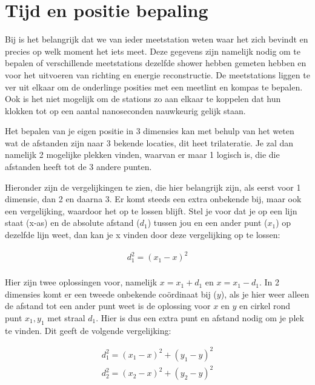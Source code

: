 \section{Tijd en positie bepaling}

Bij \hisparc is het belangrijk dat we van ieder meetstation weten waar
het zich bevindt en precies op welk moment het iets meet. Deze gegevens
zijn namelijk nodig om te bepalen of verschillende meetstations dezelfde
shower hebben gemeten hebben en voor het uitvoeren van richting en
energie reconstructie. De meetstations liggen te ver uit elkaar om de
onderlinge posities met een meetlint en kompas te bepalen. Ook is het
niet mogelijk om de stations zo aan elkaar te koppelen dat hun klokken
tot op een aantal nanoseconden nauwkeurig gelijk staan.

Het bepalen van je eigen positie in 3 dimensies kan met behulp van het
weten wat de afstanden zijn naar 3 bekende locaties, dit heet
trilateratie. Je zal dan namelijk 2 mogelijke plekken vinden, waarvan er
maar 1 logisch is, die die afstanden heeft tot de 3 andere punten.

Hieronder zijn de vergelijkingen te zien, die hier belangrijk zijn, als
eerst voor 1 dimensie, dan 2 en daarna 3. Er komt steeds een extra
onbekende bij, maar ook een vergelijking, waardoor het op te lossen
blijft. Stel je voor dat je op een lijn staat (x-as) en de absolute
afstand ($d_1$) tussen jou en een ander punt ($x_1$) op dezelfde lijn
weet, dan kan je x vinden door deze vergelijking op te lossen:

\begin{equation}
    \label{eq:1d_trilateratie}
    \begin{array}{rcl}
         d_1^2 = (x_1-x)^2 \\
    \end{array}
\end{equation}

Hier zijn twee oplossingen voor, namelijk $x = x_1+d_1$ en $x =
x_1-d_1$. In 2 dimensies komt er een tweede onbekende coördinaat bij
($y$), als je hier weer alleen de afstand tot een ander punt weet is de
oplossing voor $x$ en $y$ en cirkel rond punt $x_1, y_1$ met straal
$d_1$. Hier is dus een extra punt en afstand nodig om je plek te
vinden. Dit geeft de volgende vergelijking:

\begin{equation}
    \label{eq:2d_trailateratie}
    \begin{array}{rcl}
         d_1^2 = (x_1-x)^2+(y_1-y)^2 \\
         d_2^2 = (x_2-x)^2+(y_2-y)^2 \\
    \end{array}
\end{equation}

